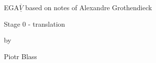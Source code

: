 
EGA$\overline{\underline{V}}$ based on notes of
Alexandre Grothendieck

Stage 0 - translation

by

Piotr Blass
